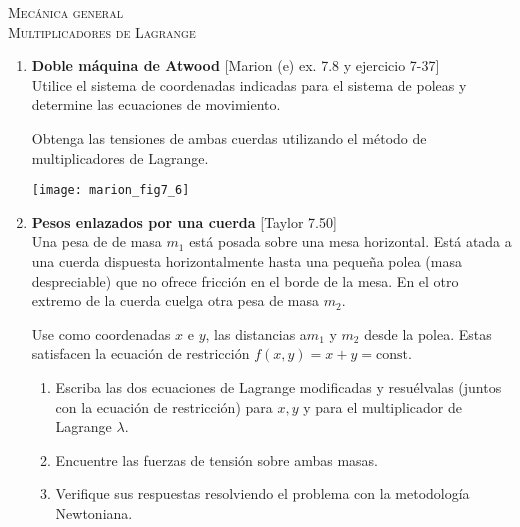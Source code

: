 \documentclass[11pt,spanish,a4paper]{article}
\begin{document}
\begin{center}
  \textsc{\large Mecánica general}\\
  \textsc{\large Multiplicadores de Lagrange}
\end{center}

\begin{enumerate}

	
\item
\begin{minipage}[t][5.5cm]{0.6\textwidth}
\textbf{Doble máquina de Atwood} [Marion (e) ex. 7.8 y ejercicio 7-37]\\
Utilice el sistema de coordenadas indicadas para el sistema de poleas y determine las ecuaciones de movimiento.

Obtenga las tensiones de ambas cuerdas utilizando el método de multiplicadores de Lagrange.
\end{minipage}
\begin{minipage}[c][4cm][t]{0.35\textwidth}
	\texttt{[image: marion\_fig7\_6]}
\end{minipage}



\item 
\textbf{Pesos enlazados por una cuerda} [Taylor 7.50]\\
Una pesa de de masa \(m_1\) está posada sobre una mesa horizontal.
Está atada a una cuerda dispuesta horizontalmente hasta una pequeña polea (masa despreciable) que no ofrece fricción en el borde de la mesa.
En el otro extremo de la cuerda cuelga otra pesa de masa \(m_2\).

Use como coordenadas \(x\) e \(y\), las distancias a\(m_1\) y \(m_2\) desde la polea.
Estas satisfacen la ecuación de restricción \(f (x, y) = x + y = \mathrm{const}\).
\begin{enumerate}
\item Escriba las dos ecuaciones de Lagrange modificadas y resuélvalas (juntos con la ecuación de restricción) para \(x, y\) y para el multiplicador de Lagrange \(\lambda\).
\item Encuentre las fuerzas de tensión sobre ambas masas.
\item Verifique sus respuestas resolviendo el problema con la metodología Newtoniana.
\end{enumerate}





\end{enumerate}
\end{document}
